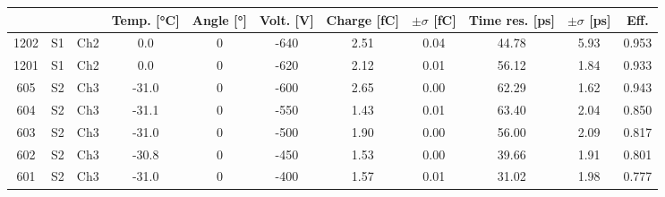 \begin{tabular}{ccccccccccc}
\toprule
 &  &  & Temp. [°C] & Angle [°] & Volt. [V] & Charge [fC] & \(\pm\sigma\) [fC] & Time res. [ps] & \(\pm\sigma\) [ps] & Eff. \\
\midrule
1202 & S1 & Ch2 & 0.0 & 0 & -640 & 2.51 & 0.04 & 44.78 & 5.93 & 0.953 \\
1201 & S1 & Ch2 & 0.0 & 0 & -620 & 2.12 & 0.01 & 56.12 & 1.84 & 0.933 \\
605 & S2 & Ch3 & -31.0 & 0 & -600 & 2.65 & 0.00 & 62.29 & 1.62 & 0.943 \\
604 & S2 & Ch3 & -31.1 & 0 & -550 & 1.43 & 0.01 & 63.40 & 2.04 & 0.850 \\
603 & S2 & Ch3 & -31.0 & 0 & -500 & 1.90 & 0.00 & 56.00 & 2.09 & 0.817 \\
602 & S2 & Ch3 & -30.8 & 0 & -450 & 1.53 & 0.00 & 39.66 & 1.91 & 0.801 \\
601 & S2 & Ch3 & -31.0 & 0 & -400 & 1.57 & 0.01 & 31.02 & 1.98 & 0.777 \\
\bottomrule
\end{tabular}
